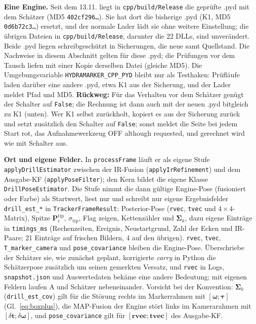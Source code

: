 \documentclass[11pt,a4paper,fleqn]{article}
\newcommand{\Ptc}{\mathbf{P}^{\mathrm{tip}}_{\mathrm{c}}}
\newcommand{\stip}{\sigma_{\mathrm{tip}}}
\newcommand{\code}[1]{\texttt{#1}}
\begin{document}
\textbf{Eine Engine.} Seit dem 13.11. liegt in \code{cpp/build/Release} die geprüfte .pyd mit dem Schätzer (MD5
\code{402cf296\ldots}). Sie hat dort die bisherige .pyd (K1, MD5 \code{0d6b72c3\ldots}) ersetzt, und der normale Lader
lädt sie ohne weitere Einstellung; die übrigen Dateien in \code{cpp/build/Release}, darunter die 22 DLLs, sind
unverändert. Beide .pyd liegen schreibgeschützt in Sicherungen, die neue samt Quellstand. Die Nachweise in diesem
Abschnitt gelten für diese .pyd; die Prüfungen vor dem Tausch liefen mit einer Kopie derselben Datei (gleiche MD5). Die
Umgebungsvariable \code{HYDRAMARKER\_CPP\_PYD} bleibt nur als Testhaken: Prüfläufe laden darüber eine andere .pyd,
etwa K1 aus der Sicherung, und der Lader meldet Pfad und MD5. \textbf{Rückweg:} Für das Verhalten vor dem Schätzer
genügt der Schalter auf \code{False}; die Rechnung ist dann auch mit der neuen .pyd bitgleich zu K1 (unten). Wer K1
selbst zurückholt, kopiert es aus der Sicherung zurück und setzt zusätzlich den Schalter auf \code{False}; sonst
meldet die Seite bei jedem Start rot, das Aufnahmewerkzeug \glqq OFF although requested\grqq, und gerechnet wird wie
mit Schalter aus.

\textbf{Ort und eigene Felder.} In \code{processFrame} läuft er als eigene Stufe \code{applyDrillEstimator}
zwischen der IR-Fusion (\code{applyIrRefinement}) und dem Ausgabe-KF (\code{applyPoseFilter}); den Kern bildet die
eigene Klasse \code{DrillPoseEstimator}. Die Stufe nimmt die dann gültige Engine-Pose (fusioniert oder Farbe) als
Startwert, liest nur und schreibt nur eigene Ergebnisfelder \code{drill\_est\_*} in \code{TrackerFrameResult}:
Posterior-Pose (\code{rvec}, \code{tvec} und $4\times4$-Matrix), Spitze $\Ptc$, $\stip$, Flag \glqq zeigen\grqq,
Kettenzähler und $\boldsymbol{\Sigma}_k$, dazu eigene Einträge in \code{timings\_ms} (Rechenzeiten, Ereignis,
Neustartgrund, Zahl der Ecken und IR-Paare; 21 Einträge auf frischen Bildern, 4 auf den übrigen). \code{rvec},
\code{tvec}, \code{T\_marker\_camera} und \code{pose\_covariance} bleiben die Engine-Pose. Überschriebe der Schätzer
sie, wie zunächst geplant, korrigierte \emph{carry} in Python die Schätzerpose zusätzlich um seinen gemerkten Versatz,
und \code{rvec} in Logs, \code{snapshot.json} und Auswertedaten bekäme eine andere Bedeutung; mit eigenen Feldern
laufen A und Schätzer nebeneinander. Vorsicht bei der Konvention: $\boldsymbol{\Sigma}_k$ (\code{drill\_est\_cov})
gilt für die Störung rechts im Markerrahmen mit $[\boldsymbol{\omega}; \boldsymbol{\tau}]$ (Gl.~\eqref{eq:boxplus}),
die MAP-Fusion der Engine stört links im Kamerarahmen mit $[\delta\mathbf{t}; \delta\boldsymbol{\omega}]$, und
\code{pose\_covariance} gilt für $[\mathbf{rvec}; \mathbf{tvec}]$ des Ausgabe-KF.
\end{document}
